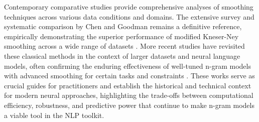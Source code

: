 \documentclass[10pt,a4paper]{article}
\begin{document}
Contemporary comparative studies provide comprehensive analyses of smoothing techniques across various data conditions and domains. The extensive survey and systematic comparison by Chen and Goodman remains a definitive reference, empirically demonstrating the superior performance of modified Kneser-Ney smoothing across a wide range of datasets \cite{anonndchen1999}. More recent studies have revisited these classical methods in the context of larger datasets and neural language models, often confirming the enduring effectiveness of well-tuned n-gram models with advanced smoothing for certain tasks and constraints \cite{anonndheafield2013} \cite{anonndjurafsky2023}. These works serve as crucial guides for practitioners and establish the historical and technical context for modern neural approaches, highlighting the trade-offs between computational efficiency, robustness, and predictive power that continue to make n-gram models a viable tool in the NLP toolkit.




\printbibliography
\end{document}
